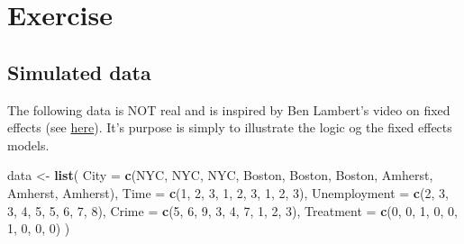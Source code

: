 \documentclass[
]{book}
\newenvironment{Shaded}{\begin{snugshade}}{\end{snugshade}}
\newcommand{\AttributeTok}[1]{\textcolor[rgb]{0.13,0.29,0.53}{#1}}
\newcommand{\DecValTok}[1]{\textcolor[rgb]{0.00,0.00,0.81}{#1}}
\newcommand{\FunctionTok}[1]{\textcolor[rgb]{0.13,0.29,0.53}{\textbf{#1}}}
\newcommand{\NormalTok}[1]{#1}
\newcommand{\OtherTok}[1]{\textcolor[rgb]{0.56,0.35,0.01}{#1}}
\newcommand{\StringTok}[1]{\textcolor[rgb]{0.31,0.60,0.02}{#1}}
\begin{document}
\hypertarget{exercise-4}{%
\section{Exercise}\label{exercise-4}}

\hypertarget{simulated-data-2}{%
\subsection{Simulated data}\label{simulated-data-2}}

The following data is NOT real and is inspired by Ben Lambert's video on fixed effects (see \href{https://www.youtube.com/watch?v=1SchyQ77VFg}{here}). It's purpose is simply to illustrate the logic og the fixed effects models.

\begin{Shaded}
\begin{Highlighting}[]
\NormalTok{data }\OtherTok{\textless{}{-}} \FunctionTok{list}\NormalTok{(}
  \AttributeTok{City =} \FunctionTok{c}\NormalTok{(}\StringTok{\textquotesingle{}NYC\textquotesingle{}}\NormalTok{, }\StringTok{\textquotesingle{}NYC\textquotesingle{}}\NormalTok{, }\StringTok{\textquotesingle{}NYC\textquotesingle{}}\NormalTok{, }\StringTok{\textquotesingle{}Boston\textquotesingle{}}\NormalTok{, }\StringTok{\textquotesingle{}Boston\textquotesingle{}}\NormalTok{, }\StringTok{\textquotesingle{}Boston\textquotesingle{}}\NormalTok{, }\StringTok{\textquotesingle{}Amherst\textquotesingle{}}\NormalTok{, }\StringTok{\textquotesingle{}Amherst\textquotesingle{}}\NormalTok{, }\StringTok{\textquotesingle{}Amherst\textquotesingle{}}\NormalTok{),}
  \AttributeTok{Time =} \FunctionTok{c}\NormalTok{(}\DecValTok{1}\NormalTok{, }\DecValTok{2}\NormalTok{, }\DecValTok{3}\NormalTok{, }\DecValTok{1}\NormalTok{, }\DecValTok{2}\NormalTok{, }\DecValTok{3}\NormalTok{, }\DecValTok{1}\NormalTok{, }\DecValTok{2}\NormalTok{, }\DecValTok{3}\NormalTok{),}
  \AttributeTok{Unemployment =} \FunctionTok{c}\NormalTok{(}\DecValTok{2}\NormalTok{, }\DecValTok{3}\NormalTok{, }\DecValTok{3}\NormalTok{, }\DecValTok{4}\NormalTok{, }\DecValTok{5}\NormalTok{, }\DecValTok{5}\NormalTok{, }\DecValTok{6}\NormalTok{, }\DecValTok{7}\NormalTok{, }\DecValTok{8}\NormalTok{),}
  \AttributeTok{Crime =} \FunctionTok{c}\NormalTok{(}\DecValTok{5}\NormalTok{, }\DecValTok{6}\NormalTok{, }\DecValTok{9}\NormalTok{, }\DecValTok{3}\NormalTok{, }\DecValTok{4}\NormalTok{, }\DecValTok{7}\NormalTok{, }\DecValTok{1}\NormalTok{, }\DecValTok{2}\NormalTok{, }\DecValTok{3}\NormalTok{),}
  \AttributeTok{Treatment =} \FunctionTok{c}\NormalTok{(}\DecValTok{0}\NormalTok{, }\DecValTok{0}\NormalTok{, }\DecValTok{1}\NormalTok{, }\DecValTok{0}\NormalTok{, }\DecValTok{0}\NormalTok{, }\DecValTok{1}\NormalTok{, }\DecValTok{0}\NormalTok{, }\DecValTok{0}\NormalTok{, }\DecValTok{0}\NormalTok{)}
\NormalTok{)}


\end{Highlighting}
\end{Shaded}
\end{document}
